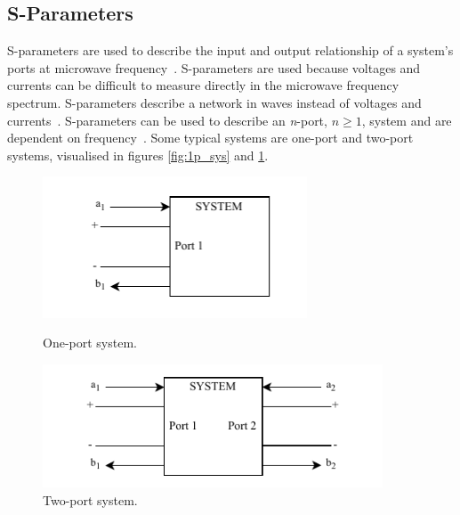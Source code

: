 \subsection{S-Parameters} \label{ss:s_params}
S-parameters are used to describe the input and output relationship of a system's ports at microwave frequency~\cite{s_params}. S-parameters are used because voltages and currents can be difficult to measure directly in the microwave frequency spectrum. S-parameters describe a network in waves instead of voltages and currents~\cite{ming_notes}. S-parameters can be used to describe an \textit{n}-port, $n\geq1$, system and are dependent on frequency~\cite{s_params}. Some typical systems are one-port and two-port systems, visualised in figures \ref{fig:1p_sys} and \ref{fig:2p_sys}.
\begin{figure}[H]
    \begin{minipage}{0.45\textwidth}
        \centering
        \includegraphics[width=0.7\textwidth]{figures/1p_system.pdf} %
        \caption{One-port system.} \label{fig:1p_sys}
    \end{minipage}\hfill
    \begin{minipage}{0.45\textwidth}
        \centering
        \includegraphics[width=0.9\textwidth]{figures/2p_system.pdf} %
        \caption{Two-port system.} \label{fig:2p_sys}
    \end{minipage}
\end{figure}


